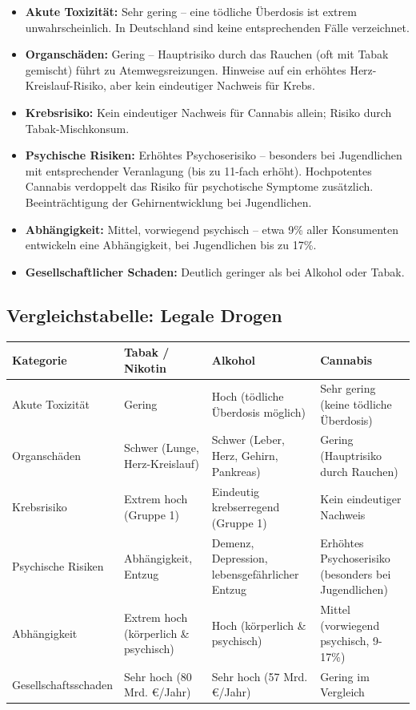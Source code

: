 \documentclass[11pt,a4paper]{article}
\begin{document}
	\begin{itemize}[leftmargin=*, noitemsep]
		\item \textbf{Akute Toxizität:} Sehr gering – eine tödliche Überdosis ist extrem unwahrscheinlich. In Deutschland sind keine entsprechenden Fälle verzeichnet. \cite{bmg-cannabis}
		\item \textbf{Organschäden:} Gering – Hauptrisiko durch das Rauchen (oft mit Tabak gemischt) führt zu Atemwegsreizungen. Hinweise auf ein erhöhtes Herz-Kreislauf-Risiko, aber kein eindeutiger Nachweis für Krebs. \cite{nida-heart}
		\item \textbf{Krebsrisiko:} Kein eindeutiger Nachweis für Cannabis allein; Risiko durch Tabak-Mischkonsum.
		\item \textbf{Psychische Risiken:} Erhöhtes Psychoserisiko – besonders bei Jugendlichen mit entsprechender Veranlagung (bis zu 11-fach erhöht). \cite{cannabis-psychosis} Hochpotentes Cannabis verdoppelt das Risiko für psychotische Symptome zusätzlich. \cite{cannabis-high-potency} Beeinträchtigung der Gehirnentwicklung bei Jugendlichen.
		\item \textbf{Abhängigkeit:} Mittel, vorwiegend psychisch – etwa 9\% aller Konsumenten entwickeln eine Abhängigkeit, bei Jugendlichen bis zu 17\%. \cite{dhs-cannabis-abhaengigkeit}
		\item \textbf{Gesellschaftlicher Schaden:} Deutlich geringer als bei Alkohol oder Tabak.
	\end{itemize}
	
	\subsection{Vergleichstabelle: Legale Drogen}
	
	\begin{table}[h!]
		\centering
		\small
		\begin{tabularx}{\textwidth}{@{} l X X X @{}}
			\toprule
			\textbf{Kategorie} & \textbf{Tabak / Nikotin} & \textbf{Alkohol} & \textbf{Cannabis} \\ \midrule
			Akute Toxizität & Gering & Hoch (tödliche Überdosis möglich) & Sehr gering (keine tödliche Überdosis) \\
			Organschäden & Schwer (Lunge, Herz-Kreislauf) & Schwer (Leber, Herz, Gehirn, Pankreas) & Gering (Hauptrisiko durch Rauchen) \\
			Krebsrisiko & Extrem hoch (Gruppe 1) & Eindeutig krebserregend (Gruppe 1) & Kein eindeutiger Nachweis \\
			Psychische Risiken & Abhängigkeit, Entzug & Demenz, Depression, lebensgefährlicher Entzug & Erhöhtes Psychoserisiko (besonders bei Jugendlichen) \\
			Abhängigkeit & Extrem hoch (körperlich \& psychisch) & Hoch (körperlich \& psychisch) & Mittel (vorwiegend psychisch, 9-17\%) \\
			Gesellschaftsschaden & Sehr hoch (80 Mrd. €/Jahr) & Sehr hoch (57 Mrd. €/Jahr) & Gering im Vergleich \\
			\bottomrule
		\end{tabularx}
	\end{table}
	
\end{document}
